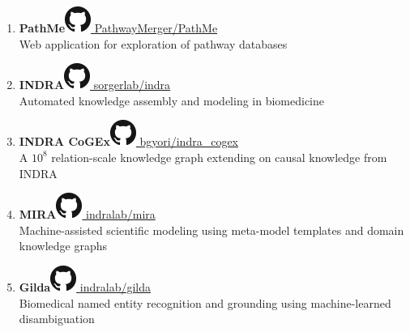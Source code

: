 \documentclass[10pt,a4paper,sans]{moderncv} %
\begin{document}
\begin{enumerate}
        \item \textbf{PathMe}\hfill\href{https://github.com/PathwayMerger/PathMe}{\includegraphics[scale=0.25]{img/GitHub-Mark-32px} PathwayMerger/PathMe}
\\
    Web application for exploration of pathway databases

        \item \textbf{INDRA}\hfill\href{https://github.com/sorgerlab/indra}{\includegraphics[scale=0.25]{img/GitHub-Mark-32px} sorgerlab/indra}
\\
    Automated knowledge assembly and modeling in biomedicine

        \item \textbf{INDRA CoGEx}\hfill\href{https://github.com/bgyori/indra\_cogex}{\includegraphics[scale=0.25]{img/GitHub-Mark-32px} bgyori/indra\_cogex}
\\
    A $10^8$ relation-scale knowledge graph extending on causal knowledge from INDRA

        \item \textbf{MIRA}\hfill\href{https://github.com/indralab/mira}{\includegraphics[scale=0.25]{img/GitHub-Mark-32px} indralab/mira}
\\
    Machine-assisted scientific modeling using meta-model templates and domain knowledge graphs

        \item \textbf{Gilda}\hfill\href{https://github.com/indralab/gilda}{\includegraphics[scale=0.25]{img/GitHub-Mark-32px} indralab/gilda}
\\
    Biomedical named entity recognition and grounding using machine-learned disambiguation

    \end{enumerate}
\end{document}
